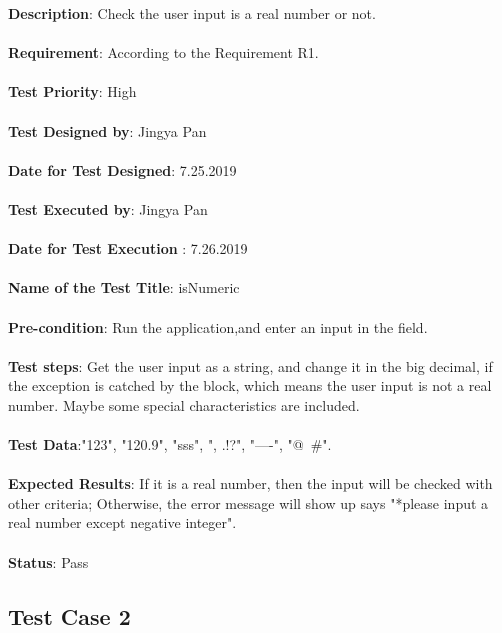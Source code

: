 \documentclass[a4paper, 11pt]{article}
\begin{document}
\textbf{Description}: Check the user input is a real number or not.\\\\
\noindent
\textbf{Requirement}: According to the Requirement R1.\\\\
\noindent
\textbf{Test Priority}: High\\\\
\noindent
\textbf{Test Designed by}: Jingya Pan\\\\
\noindent
\textbf{Date for Test Designed}: 7.25.2019\\\\
\noindent
\textbf{Test Executed by}: Jingya Pan\\\\
\noindent
\textbf{Date for Test Execution} : 7.26.2019\\\\
\noindent
\textbf{Name of the Test Title}: isNumeric\\\\
\noindent
\textbf{Pre-condition}: Run the application,and enter an input in the field.\\\\
\noindent
\textbf{Test steps}: Get the user input as a string, and change it in the big decimal, if the exception is catched by the block, which means the user input is not a real number. Maybe some special characteristics are included.\\\\
\noindent
\textbf{Test Data}:"123", "120.9", "sss", ", .!?", "----", "@~#". \\\\
\noindent
\textbf{Expected Results}: If it is a real number, then the input will be checked with other criteria; Otherwise, the error message will show up says "*please input a real number except negative integer".\\\\
\noindent
\textbf{Status}: Pass

\subsection{Test Case 2}
\end{document}
